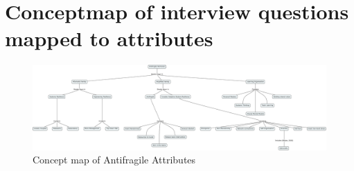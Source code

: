 \chapter{Conceptmap of interview questions mapped to attributes}
\label{app:cmapinterviewattributes}

\begin{figure}
	\centering
	\includegraphics[width=0.9\linewidth]{images/cmapafattributes}
	\caption{Concept map of Antifragile Attributes}
	\label{fig:conceptmapafattributes}
\end{figure}